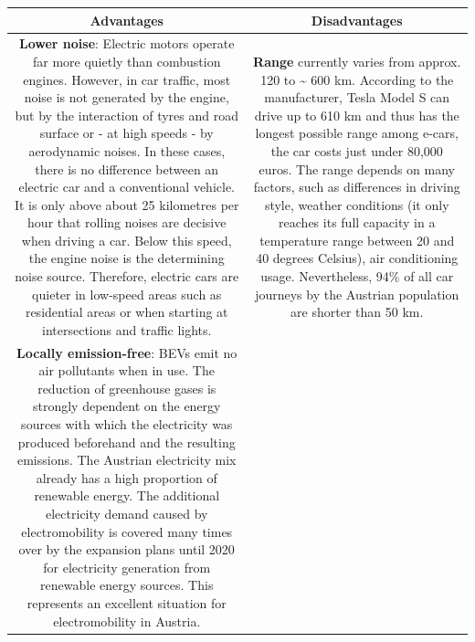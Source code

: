 \documentclass[
]{book}
\begin{document}
\begin{longtable}[]{@{}cc@{}}
\toprule
\begin{minipage}[b]{0.47\columnwidth}\centering
Advantages\strut
\end{minipage} & \begin{minipage}[b]{0.47\columnwidth}\centering
Disadvantages\strut
\end{minipage}\tabularnewline
\midrule
\endhead
\begin{minipage}[t]{0.47\columnwidth}\centering
\textbf{Lower noise}: Electric motors operate far more quietly than combustion engines. However, in car traffic, most noise is not generated by the engine, but by the interaction of tyres and road surface or - at high speeds - by aerodynamic noises. In these cases, there is no difference between an electric car and a conventional vehicle. It is only above about 25 kilometres per hour that rolling noises are decisive when driving a car. Below this speed, the engine noise is the determining noise source. Therefore, electric cars are quieter in low-speed areas such as residential areas or when starting at intersections and traffic lights.\strut
\end{minipage} & \begin{minipage}[t]{0.47\columnwidth}\centering
\textbf{Range} currently varies from approx. 120 to \textasciitilde{} 600 km. According to the manufacturer, Tesla Model S can drive up to 610 km and thus has the longest possible range among e-cars, the car costs just under 80,000 euros. The range depends on many factors, such as differences in driving style, weather conditions (it only reaches its full capacity in a temperature range between 20 and 40 degrees Celsius), air conditioning usage. Nevertheless, 94\% of all car journeys by the Austrian population are shorter than 50 km.\strut
\end{minipage}\tabularnewline
\begin{minipage}[t]{0.47\columnwidth}\centering
\textbf{Locally emission-free}: BEVs emit no air pollutants when in use. The reduction of greenhouse gases is strongly dependent on the energy sources with which the electricity was produced beforehand and the resulting emissions. The Austrian electricity mix already has a high proportion of renewable energy. The additional electricity demand caused by electromobility is covered many times over by the expansion plans until 2020 for electricity generation from renewable energy sources. This represents an excellent situation for electromobility in Austria.\strut
\end{minipage} & \begin{minipage}[t]{0.47\columnwidth}\centering

\end{minipage}
\end{longtable}
\end{document}
